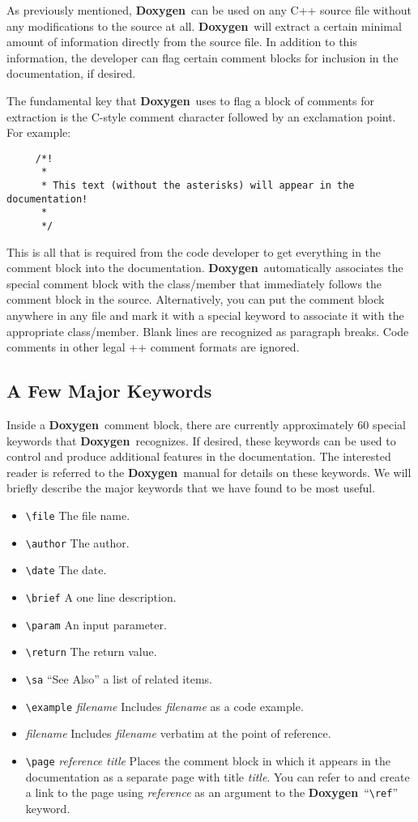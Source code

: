 \documentclass[11pt]{nmemo}
\newcommand{\doxy}{{\normalfont\bfseries Doxygen}}
\begin{document}
As previously mentioned, \doxy\ can be used on any C++ source file
without any modifications to the source at all.  \doxy\ will extract a
certain minimal amount of information directly from the source file.
In addition to this information, the developer can flag certain
comment blocks for inclusion in the documentation, if desired.

The fundamental key that \doxy\ uses to flag a block of comments for
extraction is the C-style comment character followed by an exclamation
point. For example:
\begin{verbatim}
     /*!
      *
      * This text (without the asterisks) will appear in the documentation!
      *
      */
\end{verbatim}
This is all that is required from the code developer to get everything
in the comment block into the documentation. \doxy\ automatically associates
the special comment block with the class/member that immediately follows the 
comment block in the source. Alternatively, you can put the comment block
anywhere in any file and mark it with a special keyword to associate it
with the appropriate class/member. Blank lines are recognized as paragraph
breaks. Code comments in other legal \C++ comment formats are ignored.

\subsection{A Few Major Keywords}

Inside a \doxy\ comment block, there are currently approximately 60
special keywords that \doxy\ recognizes. If desired, these keywords
can be used to control and produce additional features in the
documentation.  The interested reader is referred to the \doxy\ manual
for details on these keywords.  We will briefly describe the major
keywords that we have found to be most useful.
\begin{itemize}
\item \verb+\file+ The file name.
\item \verb+\author+ The author.
\item \verb+\date+ The date.
\item \verb+\brief+ A one line description.
\item \verb+\param+ An input parameter.
\item \verb+\return+ The return value.
\item \verb+\sa+ ``See Also'' a list of related items.
\item \verb+\example+ {\em filename} Includes {\em filename} as a code
  example.
\item \verb++ {\em filename} Includes {\em filename} verbatim at the
  point of reference.
\item \verb+\page+ {\em reference title} Places the comment block in which
  it appears in the documentation as a separate page with title {\em
    title}. You can refer to and create a link to the page using {\em
    reference} as an argument to the \doxy\ ``\verb+\ref+'' keyword.
\end{itemize}
\end{document}

